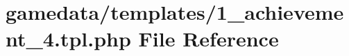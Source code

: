 \hypertarget{1__achievement__4_8tpl_8php}{\section{gamedata/templates/1\+\_\+achievement\+\_\+4.tpl.\+php File Reference}
\label{1__achievement__4_8tpl_8php}
}
